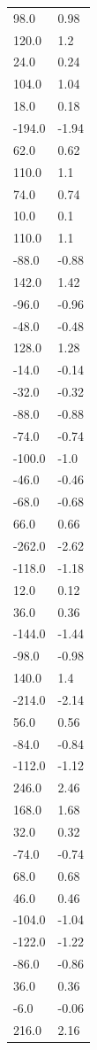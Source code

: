\begin{longtable}{ll}
98.0 & 0.98 \\
120.0 & 1.2 \\
24.0 & 0.24 \\
104.0 & 1.04 \\
18.0 & 0.18 \\
-194.0 & -1.94 \\
62.0 & 0.62 \\
110.0 & 1.1 \\
74.0 & 0.74 \\
10.0 & 0.1 \\
110.0 & 1.1 \\
-88.0 & -0.88 \\
142.0 & 1.42 \\
-96.0 & -0.96 \\
-48.0 & -0.48 \\
128.0 & 1.28 \\
-14.0 & -0.14 \\
-32.0 & -0.32 \\
-88.0 & -0.88 \\
-74.0 & -0.74 \\
-100.0 & -1.0 \\
-46.0 & -0.46 \\
-68.0 & -0.68 \\
66.0 & 0.66 \\
-262.0 & -2.62 \\
-118.0 & -1.18 \\
12.0 & 0.12 \\
36.0 & 0.36 \\
-144.0 & -1.44 \\
-98.0 & -0.98 \\
140.0 & 1.4 \\
-214.0 & -2.14 \\
56.0 & 0.56 \\
-84.0 & -0.84 \\
-112.0 & -1.12 \\
246.0 & 2.46 \\
168.0 & 1.68 \\
32.0 & 0.32 \\
-74.0 & -0.74 \\
68.0 & 0.68 \\
46.0 & 0.46 \\
-104.0 & -1.04 \\
-122.0 & -1.22 \\
-86.0 & -0.86 \\
36.0 & 0.36 \\
-6.0 & -0.06 \\
216.0 & 2.16 \\

\end{longtable}
